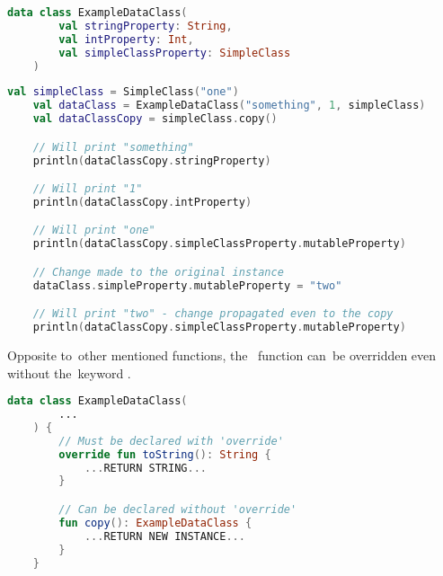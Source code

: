 \begin{lstlisting}[language=Kotlin, title={Data class}]
    data class ExampleDataClass(
        val stringProperty: String,
        val intProperty: Int,
        val simpleClassProperty: SimpleClass
    )
\end{lstlisting}
\begin{lstlisting}[language=Kotlin, title={\itq{copy} behavior}]
    val simpleClass = SimpleClass("one")
    val dataClass = ExampleDataClass("something", 1, simpleClass)
    val dataClassCopy = simpleClass.copy()

    // Will print "something"
    println(dataClassCopy.stringProperty)

    // Will print "1"
    println(dataClassCopy.intProperty)

    // Will print "one"
    println(dataClassCopy.simpleClassProperty.mutableProperty)

    // Change made to the original instance
    dataClass.simpleProperty.mutableProperty = "two"

    // Will print "two" - change propagated even to the copy
    println(dataClassCopy.simpleClassProperty.mutableProperty)
\end{lstlisting}

\warning Opposite to~other mentioned functions, the~ function can~be overridden even without the~keyword \mbox{.}

\begin{lstlisting}[language=Kotlin]
    data class ExampleDataClass(
        ...
    ) {
        // Must be declared with 'override'
        override fun toString(): String {
            ...RETURN STRING...
        }

        // Can be declared without 'override'
        fun copy(): ExampleDataClass {
            ...RETURN NEW INSTANCE...
        }
    }
\end{lstlisting}
\newpage
